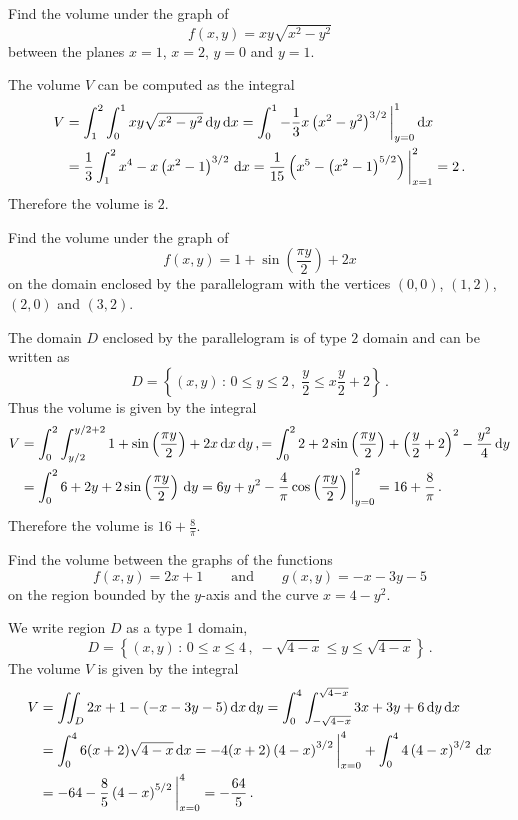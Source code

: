 \begin{question}
Find the volume under the graph of
\[
f(x,y) = xy\sqrt{x^2 -y^2}
\]
between the planes $x=1$, $x=2$, $y=0$ and $y=1$.
\end{question}

\begin{solution}
The volume $V$ can be computed as the integral
\begin{align*}
V
&= \int_1^2 \int_0^1 xy \sqrt{x^2-y^2} \,\mathrm{d} y \,\mathrm{d} x
= \int_0^1 -\frac 13 x \left( x^2-y^2\right)^{3/2} \bigg|_{y=0}^1 \,\mathrm{d} x \\
&= \frac 13 \int_1^2 x^4 - x \left(x^2-1\right)^{3/2} \,\mathrm{d} x
= \frac 1{15} \left( x^5 - \left(x^2-1\right)^{5/2} \right) \bigg|_{x=1}^2
= 2\,.
\end{align*}
Therefore the volume is $2$.
\end{solution}

\begin{question}
Find the volume under the graph of
\[
f(x,y) = 1+\sin\left( \frac{\pi y}{2}\right) +2x
\]
on the domain enclosed by the parallelogram with the vertices $(0,0)$, $(1,2)$, $(2,0)$ and $(3,2)$.
\end{question}

\begin{solution}
The domain $D$ enclosed by the parallelogram is of type $2$ domain and can be written as
\[
D = \left\{ (x,y) \,:\, 0 \leq y \leq 2\,,\; \frac y2 \leq x \frac y2 + 2 \right\}\,.
\]
Thus the volume is given by the integral
\begin{align*}
V
&=\int_0^2 \int_{y/2}^{y/2+2} 1 + \sin \left(\frac{\pi y}2 \right) + 2x \,\mathrm{d} x \,\mathrm{d} y\,,
= \int_0^2 2 + 2 \sin \left( \frac{\pi y}{2} \right) + \left( \frac y2 + 2\right)^2 - \frac{y^2}4 \,\mathrm{d} y \\
&= \int_0^2 6 + 2y + 2 \sin \left( \frac{\pi y}2 \right) \,\mathrm{d} y
= 6y + y^2 - \frac 4\pi \cos \left(\frac {\pi y}2 \right) \bigg|_{y=0}^2
= 16 + \frac 8\pi\,.
\end{align*}
Therefore the volume is $16 + \frac 8\pi$.
\end{solution}

\begin{question}
Find the volume between the graphs of the functions 
\[
f(x,y) = 2x+1
\qquad\text{and}\qquad
g(x,y)=-x-3y-5
\]
on the region bounded by the $y$-axis and the curve $x=4-y^2$.
\end{question}

\begin{solution}
We write region $D$ as a type 1 domain,
\[
D = \left\{ (x,y) \,:\, 0 \leq x \leq 4\,,\; -\sqrt{4-x} \leq y \leq \sqrt{4-x} \right\}\,.
\]
The volume $V$ is given by the integral
\begin{align*}
V &= \iint_D 2x+1 - (-x-3y-5) \,\mathrm{d} x \,\mathrm{d} y
= \int_0^4 \int_{-\sqrt{4-x}}^{\sqrt{4-x}} 3x+3y+6 \,\mathrm{d} y \,\mathrm{d} x \\
&= \int_0^4 6(x+2) \sqrt{4-x} \,\mathrm{d} x
= -4(x+2) \left(4-x\right)^{3/2}\bigg|_{x=0}^4 + \int_0^4 4 \left(4-x\right)^{3/2} \,\mathrm{d} x \\
&= -64 - \frac 85 \left(4-x\right)^{5/2} \bigg|_{x=0}^4
= -\frac{64}5\,.
\end{align*}
\end{solution}

